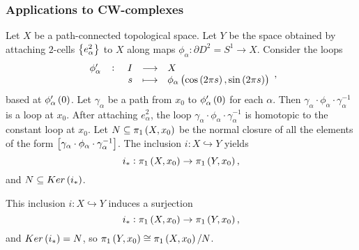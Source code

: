 \pagebreak

\subsubsection{Applications to CW-complexes}

Let $ X $ be a path-connected topological space. Let $ Y $ be the space obtained by attaching $ 2 $-cells $ \cbr{e_\alpha^2} $ to $ X $ along maps $ \phi_\alpha : \partial D^2 = S^1 \to X $. Consider the loops
$$ \function[\phi_\alpha']{I}{X}{s}{\phi_\alpha\br{\cos\br{2\pi s}, \sin\br{2\pi s}}}, $$
based at $ \phi_\alpha'\br{0} $. Let $ \gamma_\alpha $ be a path from $ x_0 $ to $ \phi_\alpha'\br{0} $ for each $ \alpha $. Then $ \gamma_\alpha \cdot \phi_\alpha \cdot \gamma_\alpha^{-1} $ is a loop at $ x_0 $. After attaching $ e_\alpha^2 $, the loop $ \gamma_\alpha \cdot \phi_\alpha \cdot \gamma_\alpha^{-1} $ is homotopic to the constant loop at $ x_0 $. Let $ N \subseteq \pi_1\br{X, x_0} $ be the normal closure of all the elements of the form $ \sbr{\gamma_\alpha \cdot \phi_\alpha \cdot \gamma_\alpha^{-1}} $. The inclusion $ i : X \hookrightarrow Y $ yields
$$ i_* : \pi_1\br{X, x_0} \to \pi_1\br{Y, x_0}, $$
and $ N \subseteq Ker\br{i_*} $.

\begin{proposition}
\label{prop:1.26}
This inclusion $ i : X \hookrightarrow Y $ induces a surjection
$$ i_* : \pi_1\br{X, x_0} \to \pi_1\br{Y, x_0}, $$
and $ Ker\br{i_*} = N $, so $ \pi_1\br{Y, x_0} \cong \pi_1\br{X, x_0} / N $.
\end{proposition}


